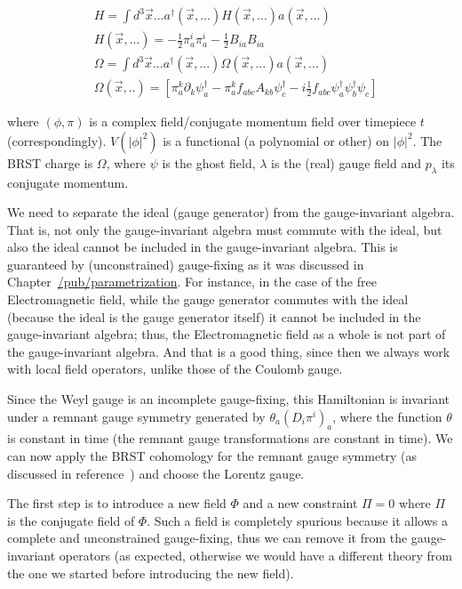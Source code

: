 \documentclass[11pt]{book}
\begin{document}
\begin{equation}\begin{aligned}
    &H=\int d^3\vec{x} ... a^\dagger(\vec{x}, ...)H(\vec{x}, ...)  a(\vec{x}, ...)\\
&H(\vec{x}, ...)=-\frac{1}{2}\pi^i_a\pi^i_a
    -\frac{1}{2} B_{i a} B_{i a}\\
    &\Omega=\int d^3\vec{x} ...  a^\dagger(\vec{x}, ...) \Omega(\vec{x},...) a(\vec{x}, ...)\\
    &\Omega(\vec{x},..)=\left[ \pi^{k}_{a} \partial_{k} \psi^\dagger_{a}-\pi^{k}_{a} f_{a b c} A_{k b} \psi^\dagger_{c} -i \frac{1}{2}f_{a b c} \psi^\dagger_{a} \psi^\dagger_{b} \psi_{c}\right]
\end{aligned}\end{equation}

where \((\phi,\pi)\) is a complex field/conjugate momentum field over
timepiece \(t\) (correspondingly). \(V(|\phi|^2)\) is a functional (a
polynomial or other) on \(|\phi|^2\). The BRST charge is \(\Omega\),
where \(\psi\) is the ghost field, \(\lambda\) is the (real) gauge field
and \(p_\lambda\) its conjugate momentum.

We need to separate the ideal (gauge generator) from the gauge-invariant
algebra. That is, not only the gauge-invariant algebra must commute with
the ideal, but also the ideal cannot be included in the gauge-invariant
algebra. This is guaranteed by (unconstrained) gauge-fixing as it was
discussed in
Chapter~\href{https://timepiece.pubpub.org/pub/parametrization}{/pub/parametrization}.
For instance, in the case of the free Electromagnetic field, while the
gauge generator commutes with the ideal (because the ideal is the gauge
generator itself) it cannot be included in the gauge-invariant algebra;
thus, the Electromagnetic field as a whole is not part of the
gauge-invariant algebra. And that is a good thing, since then we always
work with local field operators, unlike those of the Coulomb gauge.

Since the Weyl gauge is an incomplete gauge-fixing, this Hamiltonian is
invariant under a remnant gauge symmetry generated by
\(\theta_a (D_i \pi^i)_{a}\), where the function \(\theta\) is constant
in time (the remnant gauge transformations are constant in time). We can
now apply the BRST cohomology for the remnant gauge symmetry (as
discussed in
reference~\cite{Henneaux1992Quantization}) and choose the Lorentz gauge.

The first step is to introduce a new field \(\Phi\) and a new constraint
\(\Pi=0\) where \(\Pi\) is the conjugate field of \(\Phi\). Such a field
is completely spurious because it allows a complete and unconstrained
gauge-fixing, thus we can remove it from the gauge-invariant operators
(as expected, otherwise we would have a different theory from the one we
started before introducing the new field).
\end{document}
